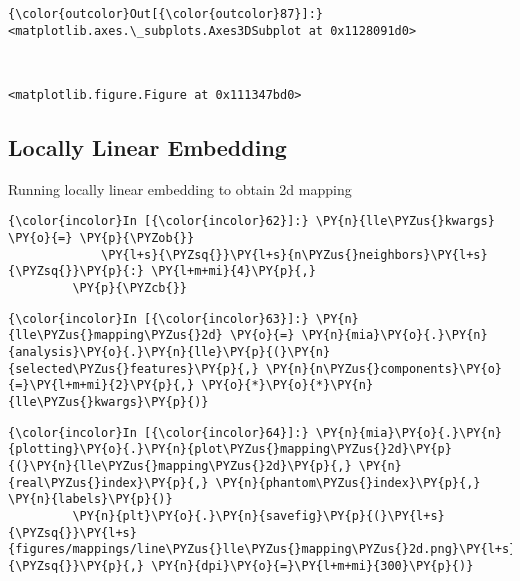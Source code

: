             \begin{Verbatim}[commandchars=\\\{\}]
{\color{outcolor}Out[{\color{outcolor}87}]:} <matplotlib.axes.\_subplots.Axes3DSubplot at 0x1128091d0>
\end{Verbatim}

    \begin{center}
    \end{center}
    { \hspace*{\fill} \\}


    \begin{verbatim}
<matplotlib.figure.Figure at 0x111347bd0>
    \end{verbatim}


    \subsection{Locally Linear Embedding}\label{locally-linear-embedding}

Running locally linear embedding to obtain 2d mapping

    \begin{Verbatim}[commandchars=\\\{\}]
{\color{incolor}In [{\color{incolor}62}]:} \PY{n}{lle\PYZus{}kwargs} \PY{o}{=} \PY{p}{\PYZob{}}
             \PY{l+s}{\PYZsq{}}\PY{l+s}{n\PYZus{}neighbors}\PY{l+s}{\PYZsq{}}\PY{p}{:} \PY{l+m+mi}{4}\PY{p}{,}
         \PY{p}{\PYZcb{}}
\end{Verbatim}

    \begin{Verbatim}[commandchars=\\\{\}]
{\color{incolor}In [{\color{incolor}63}]:} \PY{n}{lle\PYZus{}mapping\PYZus{}2d} \PY{o}{=} \PY{n}{mia}\PY{o}{.}\PY{n}{analysis}\PY{o}{.}\PY{n}{lle}\PY{p}{(}\PY{n}{selected\PYZus{}features}\PY{p}{,} \PY{n}{n\PYZus{}components}\PY{o}{=}\PY{l+m+mi}{2}\PY{p}{,} \PY{o}{*}\PY{o}{*}\PY{n}{lle\PYZus{}kwargs}\PY{p}{)}
\end{Verbatim}

    \begin{Verbatim}[commandchars=\\\{\}]
{\color{incolor}In [{\color{incolor}64}]:} \PY{n}{mia}\PY{o}{.}\PY{n}{plotting}\PY{o}{.}\PY{n}{plot\PYZus{}mapping\PYZus{}2d}\PY{p}{(}\PY{n}{lle\PYZus{}mapping\PYZus{}2d}\PY{p}{,} \PY{n}{real\PYZus{}index}\PY{p}{,} \PY{n}{phantom\PYZus{}index}\PY{p}{,} \PY{n}{labels}\PY{p}{)}
         \PY{n}{plt}\PY{o}{.}\PY{n}{savefig}\PY{p}{(}\PY{l+s}{\PYZsq{}}\PY{l+s}{figures/mappings/line\PYZus{}lle\PYZus{}mapping\PYZus{}2d.png}\PY{l+s}{\PYZsq{}}\PY{p}{,} \PY{n}{dpi}\PY{o}{=}\PY{l+m+mi}{300}\PY{p}{)}
\end{Verbatim}

